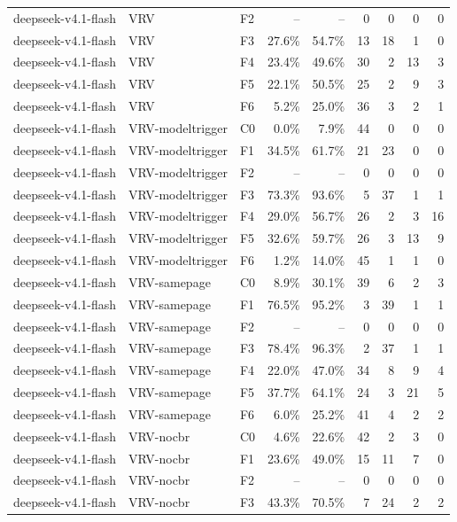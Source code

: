 \begin{tabular}{lllrrrrrr}
deepseek-v4.1-flash & VRV & F2 & -- & -- & 0 & 0 & 0 & 0 \\
deepseek-v4.1-flash & VRV & F3 & 27.6\% & 54.7\% & 13 & 18 & 1 & 0 \\
deepseek-v4.1-flash & VRV & F4 & 23.4\% & 49.6\% & 30 & 2 & 13 & 3 \\
deepseek-v4.1-flash & VRV & F5 & 22.1\% & 50.5\% & 25 & 2 & 9 & 3 \\
deepseek-v4.1-flash & VRV & F6 & 5.2\% & 25.0\% & 36 & 3 & 2 & 1 \\
deepseek-v4.1-flash & VRV-modeltrigger & C0 & 0.0\% & 7.9\% & 44 & 0 & 0 & 0 \\
deepseek-v4.1-flash & VRV-modeltrigger & F1 & 34.5\% & 61.7\% & 21 & 23 & 0 & 0 \\
deepseek-v4.1-flash & VRV-modeltrigger & F2 & -- & -- & 0 & 0 & 0 & 0 \\
deepseek-v4.1-flash & VRV-modeltrigger & F3 & 73.3\% & 93.6\% & 5 & 37 & 1 & 1 \\
deepseek-v4.1-flash & VRV-modeltrigger & F4 & 29.0\% & 56.7\% & 26 & 2 & 3 & 16 \\
deepseek-v4.1-flash & VRV-modeltrigger & F5 & 32.6\% & 59.7\% & 26 & 3 & 13 & 9 \\
deepseek-v4.1-flash & VRV-modeltrigger & F6 & 1.2\% & 14.0\% & 45 & 1 & 1 & 0 \\
deepseek-v4.1-flash & VRV-samepage & C0 & 8.9\% & 30.1\% & 39 & 6 & 2 & 3 \\
deepseek-v4.1-flash & VRV-samepage & F1 & 76.5\% & 95.2\% & 3 & 39 & 1 & 1 \\
deepseek-v4.1-flash & VRV-samepage & F2 & -- & -- & 0 & 0 & 0 & 0 \\
deepseek-v4.1-flash & VRV-samepage & F3 & 78.4\% & 96.3\% & 2 & 37 & 1 & 1 \\
deepseek-v4.1-flash & VRV-samepage & F4 & 22.0\% & 47.0\% & 34 & 8 & 9 & 4 \\
deepseek-v4.1-flash & VRV-samepage & F5 & 37.7\% & 64.1\% & 24 & 3 & 21 & 5 \\
deepseek-v4.1-flash & VRV-samepage & F6 & 6.0\% & 25.2\% & 41 & 4 & 2 & 2 \\
deepseek-v4.1-flash & VRV-nocbr & C0 & 4.6\% & 22.6\% & 42 & 2 & 3 & 0 \\
deepseek-v4.1-flash & VRV-nocbr & F1 & 23.6\% & 49.0\% & 15 & 11 & 7 & 0 \\
deepseek-v4.1-flash & VRV-nocbr & F2 & -- & -- & 0 & 0 & 0 & 0 \\
deepseek-v4.1-flash & VRV-nocbr & F3 & 43.3\% & 70.5\% & 7 & 24 & 2 & 2 \\

\end{tabular}
